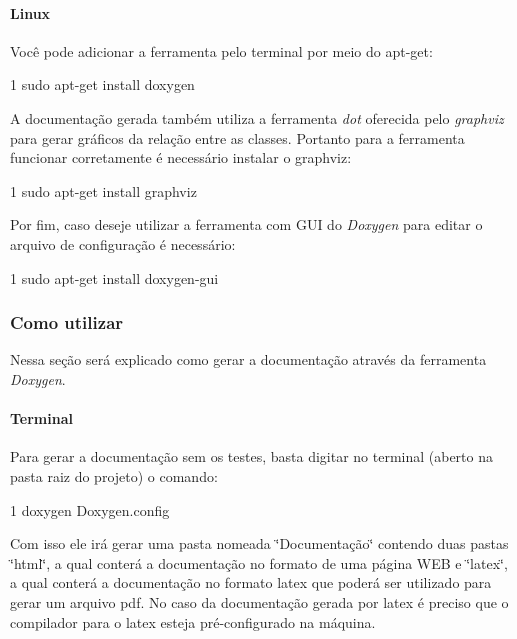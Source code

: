 \paragraph*{Linux}

Você pode adicionar a ferramenta pelo terminal por meio do apt-\/get\+:


\begin{DoxyCode}
1 sudo apt-get install doxygen 
\end{DoxyCode}


A documentação gerada também utiliza a ferramenta {\itshape dot} oferecida pelo {\itshape graphviz} para gerar gráficos da relação entre as classes. Portanto para a ferramenta funcionar corretamente é necessário instalar o graphviz\+:


\begin{DoxyCode}
1 sudo apt-get install graphviz
\end{DoxyCode}


Por fim, caso deseje utilizar a ferramenta com G\+UI do {\itshape Doxygen} para editar o arquivo de configuração é necessário\+:


\begin{DoxyCode}
1 sudo apt-get install doxygen-gui
\end{DoxyCode}


\subsubsection*{Como utilizar}

Nessa seção será explicado como gerar a documentação através da ferramenta {\itshape Doxygen}.

\paragraph*{Terminal}

Para gerar a documentação sem os testes, basta digitar no terminal (aberto na pasta raiz do projeto) o comando\+:


\begin{DoxyCode}
1 doxygen Doxygen.config 
\end{DoxyCode}


Com isso ele irá gerar uma pasta nomeada \char`\"{}\+Documentação\char`\"{} contendo duas pastas \char`\"{}html\char`\"{}, a qual conterá a documentação no formato de uma página W\+EB e \char`\"{}latex\char`\"{}, a qual conterá a documentação no formato latex que poderá ser utilizado para gerar um arquivo pdf. No caso da documentação gerada por latex é preciso que o compilador para o latex esteja pré-\/configurado na máquina.

